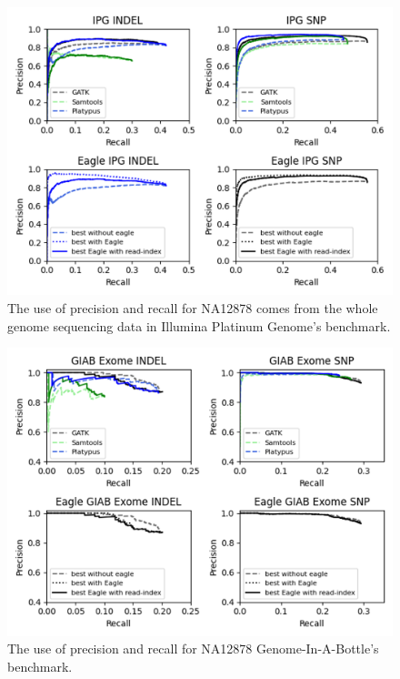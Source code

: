 \documentclass[PhD]{PHlab-thesis}
\begin{document}
\begin{figure}[h!]
	\centering
	\includegraphics[scale=0.45]{figures/IPG result.png}
	\caption{The use of precision and recall for NA12878 comes from the whole genome sequencing data in Illumina Platinum Genome’s benchmark.}
	\label{fig:The result of IPG dataset} %
\end{figure}

\begin{figure}[h!]
	\centering
	\includegraphics[scale=0.45]{figures/GIAB result.png}
	\caption{The use of precision and recall for NA12878 Genome-In-A-Bottle’s benchmark.}
	\label{fig:The result of GIAB dataset} %
\end{figure}
\end{document}
